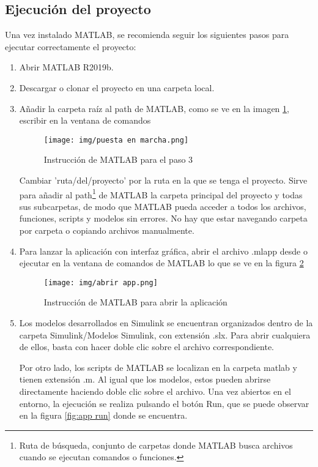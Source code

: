\subsection{Ejecución del proyecto}
Una vez instalado MATLAB, se recomienda seguir los siguientes pasos para ejecutar correctamente el proyecto:
\begin{enumerate}
    \item Abrir MATLAB R2019b.
    \item Descargar o clonar el proyecto en una carpeta local.
    \item Añadir la carpeta raíz al path de MATLAB, como se ve en la imagen \ref{fig:instruccion}, escribir en la ventana de comandos
    \begin{figure}[H]
        \centering
        \texttt{[image: img/puesta en marcha.png]}
        \caption{Instrucción de MATLAB para el paso 3}
        \label{fig:instruccion}
        \vspace{0.5cm} %
    \end{figure}
    Cambiar 'ruta/del/proyecto' por la ruta en la que se tenga el proyecto.
    Sirve para añadir al path\footnote{Ruta de búsqueda, conjunto de carpetas donde MATLAB busca archivos cuando se ejecutan comandos o funciones.} de MATLAB la carpeta principal del proyecto y todas sus subcarpetas, de modo que MATLAB pueda acceder a todos los archivos, funciones, scripts y modelos sin errores. No hay que estar navegando carpeta por carpeta o copiando archivos manualmente.
    \item Para lanzar la aplicación con interfaz gráfica, abrir el archivo .mlapp desde o ejecutar en la ventana de comandos de MATLAB lo que se ve en la figura \ref{fig:app abrir}
    \begin{figure}[H]
        \centering
        \texttt{[image: img/abrir app.png]}
        \caption{Instrucción de MATLAB para abrir la aplicación}
        \label{fig:app abrir}
        \vspace{0.5cm} %
    \end{figure}
    \item Los modelos desarrollados en Simulink se encuentran organizados dentro de la carpeta Simulink/Modelos Simulink, con extensión .slx. Para abrir cualquiera de ellos, basta con hacer doble clic sobre el archivo correspondiente.
   
    Por otro lado, los scripts de MATLAB se localizan en la carpeta matlab y tienen extensión .m. Al igual que los modelos, estos pueden abrirse directamente haciendo doble clic sobre el archivo. 
    Una vez abiertos en el entorno, la ejecución se realiza pulsando el botón Run, que se puede observar en la figura \ref{fig:app run} donde se encuentra.


\end{enumerate}
